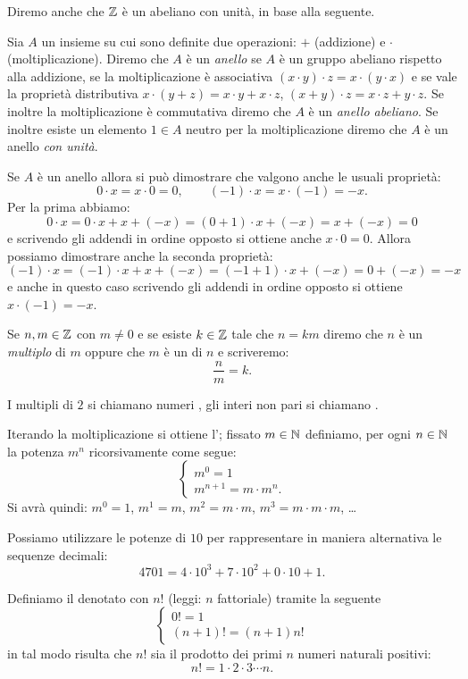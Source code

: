Diremo anche che ${\mathbb Z}$ è un  abeliano con unità, in base alla seguente.
%
\begin{definition}[anello]
  Sia $A$ un insieme su cui sono definite due operazioni: $+$ (addizione) e $\cdot$ (moltiplicazione).  
  Diremo che $A$ è un \emph{anello} se $A$ è un gruppo abeliano rispetto alla 
  addizione, 
  se la moltiplicazione è associativa $(x\cdot y)\cdot z = x\cdot (y\cdot x)$ 
  e se vale la proprietà distributiva $x\cdot(y+z) = x\cdot y + x\cdot z$,
  $(x+y)\cdot z = x\cdot z + y\cdot z$.
  Se inoltre la moltiplicazione è commutativa diremo che $A$ è un \emph{anello abeliano}.
  Se inoltre esiste un elemento $1\in A$ neutro per la moltiplicazione 
  diremo che $A$ è un anello \emph{con unità}.
\end{definition}

Se $A$ è un anello allora si può dimostrare che valgono anche le usuali proprietà:
\[
  0\cdot x = x\cdot 0 = 0, \qquad
  (-1)\cdot x = x \cdot (-1) = -x.
\]
Per la prima abbiamo: 
\[
  0\cdot x = 0\cdot x + x + (-x) = (0+1)\cdot x + (-x) = x + (-x) = 0
\]
e scrivendo gli addendi in ordine opposto si ottiene anche $x\cdot 0 = 0$.
Allora possiamo dimostrare anche la seconda proprietà:
\[
   (-1)\cdot x = (-1)\cdot x + x + (-x) = (-1 + 1)\cdot x + (-x) = 0 + (-x) = -x
\]
e anche in questo caso scrivendo gli addendi in ordine opposto si ottiene $x\cdot(-1)=-x$.

Se $n,m\in{\mathbb Z}$ con $m\neq 0$ e 
%
se esiste $k\in{\mathbb Z}$ tale 
che $n=km$ diremo che $n$ è un \emph{multiplo}
di $m$ oppure che $m$ è un  di $n$
e scriveremo:
\[
  \frac{n}{m} = k.  
\]

I multipli di $2$ si chiamano numeri ,
gli interi non pari si chiamano . 

Iterando la moltiplicazione si ottiene 
l';
fissato $m\in {\mathbb N}$ definiamo, per ogni $n\in {\mathbb N}$ la potenza $m^n$ 
ricorsivamente come segue:
\[
  \begin{cases}
    m^0 = 1 \\
    m^{n+1} = m \cdot m^n.
  \end{cases}
\]
Si avrà quindi: $m^0=1$, $m^1=m$, $m^2=m\cdot m$, $m^3=m\cdot m\cdot m$, \dots

Possiamo utilizzare le potenze di $10$ per rappresentare in maniera alternativa 
le sequenze decimali:
\[
  4701 = 4\cdot 10^3 + 7\cdot 10^2+0\cdot 10 + 1.
\]

Definiamo il 
%
%
denotato con $n!$ (leggi: $n$ fattoriale) 
tramite la seguente 
\[
  \begin{cases}
    0! = 1 \\
    (n+1)! = (n+1) n!
  \end{cases}
\]
in tal modo risulta che $n!$ sia il prodotto dei primi $n$ numeri naturali positivi:
\[
  n! = 1 \cdot 2 \cdot 3 \cdots n.  
\]

